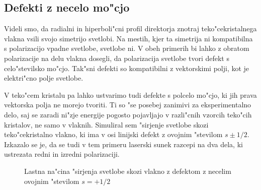 \documentclass[a4paper,10pt]{article}
\begin{document}
\subsection{Defekti z necelo mo"cjo}

Videli smo, da radialni in hiperboli"cni profil direktorja znotraj teko"cekristalnega vlakna vsili svojo simetrijo svetlobi. 
Na mestih, kjer ta simetrija ni kompatibilna s polarizacijo vpadne svetlobe, svetlobe ni. 
V obeh primerih bi lahko z obratom polarizacije na delu vlakna dosegli, da polarizacija svetlobe tvori defekt s celo"stevilsko mo"cjo. 
Tak"sni defekti so kompatibilni z vektorskimi polji, kot je elektri"cno polje svetlobe. 

V teko"cem kristalu pa lahko ustvarimo tudi defekte s polcelo mo"cjo, ki jih prava vektorska polja ne morejo tvoriti. 
Ti so "se posebej zanimivi za eksperimentalno delo, saj se zaradi ni"zje energije pogosto pojavljajo v razli"cnih vzorcih teko"cih kristalov, ne samo v vlaknih. 
Simuliral sem "sirjenje svetlobe skozi teko"cekristalno vlakno, ki ima v osi linijski defekt z ovojnim "stevilom $s \pm 1/2$. 
Izkazalo se je, da se tudi v tem primeru laserski sunek razcepi na dva dela, ki ustrezata redni in izredni polarizaciji. 

\begin{figure}[!htbp]
 \centering
 \caption{Lastna na"cina "sirjenja svetlobe skozi vlakno z defektom z necelim ovojnim "stevilom $s=+1/2$}
 \label{fig:pulse-p12-mode}
\end{figure}
\end{document}
